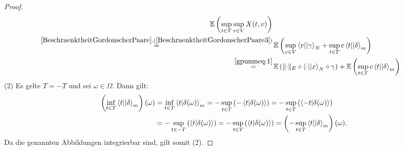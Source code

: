 \begin{proof}
\begin{align*}
\E\left(\sup_{t \in T}\sup_{v \in V}X(t, v) \right)\\
\overset{\refclaim{BeschraenktheitGordonscherPaare}
{BeschraenktheitGordonscherPaare3}} = &\,
\E\left(\sup_{v \in V}\bprod v \gamma_N
+ \sup_{t\in T}c\bprod t \delta_m\right)\\
\overset{\eqref{gpunmeq:1}}=&\,
\E\left( \norm\cdot_E \circ \bprod \cdot x _N \circ \gamma\right)
	+  \E\left(\sup_{t\in T}c\bprod t \delta_m \right)
\end{align*}
(2) Es gelte $T=-T$ und sei $\omega \in \Omega$. Dann gilt:
\begin{align*}
\left(\inf_{t\in T}\left\langle t ||\delta\right\rangle_m\right)(\omega)
&= \inf_{t \in T}\left\langle t |\delta(\omega)\right\rangle_m
= - \sup_{t\in T}\left(-\left\langle t |\delta(\omega)\right\rangle\right)
= - \sup_{t\in T}\left(\left\langle -t |\delta(\omega)\right\rangle\right)\\
&=- \sup_{t\in -T}\left(\left\langle t |\delta(\omega)\right\rangle\right)
=- \sup_{t\in T}\left(\left\langle t |\delta(\omega)\right\rangle\right)
= \left(- \sup_{t\in T}\left\langle t ||\delta\right\rangle_m \right)(\omega)\text.
\end{align*}
Da die genannten Abbildungen integrierbar sind, gilt somit (2).
\end{proof}